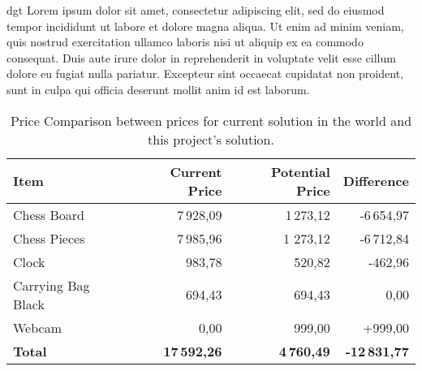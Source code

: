 
\gls{dgt} Lorem ipsum dolor sit amet, consectetur adipiscing elit, sed do eiusmod tempor incididunt ut labore et dolore magna aliqua. Ut enim ad minim veniam, quis nostrud exercitation ullamco laboris nisi ut aliquip ex ea commodo consequat. Duis aute irure dolor in reprehenderit in voluptate velit esse cillum dolore eu fugiat nulla pariatur. Excepteur sint occaecat cupidatat non proident, sunt in culpa qui officia deserunt mollit anim id est laborum. 


\begin{table}[h!]
\centering
\caption{Price Comparison between prices for current solution in the world and this project's solution. \cite{dgtshop:prices}}
\label{tab:price-comparison}
    \begin{tabular}{lrrr}
        \toprule
        \textbf{Item} & \textbf{Current Price} & \textbf{Potential Price} & \textbf{Difference} \\
        \midrule
        Chess Board & 7\,928,09 & 1\,273,12 & -6\,654,97 \\
        Chess Pieces & 7\,985,96 & 1 273,12 & -6\,712,84 \\
        Clock & 983,78 & 520,82 & -462,96 \\
        Carrying Bag Black & 694,43 & 694,43 & 0,00 \\
        Webcam & 0,00 & 999,00 & +999,00 \\
        \midrule
         \textbf{Total} & \textbf{17\,592,26} & \textbf{4\,760,49} & \textbf{-12\,831,77} \\
        \bottomrule
    \end{tabular}
\end{table}

